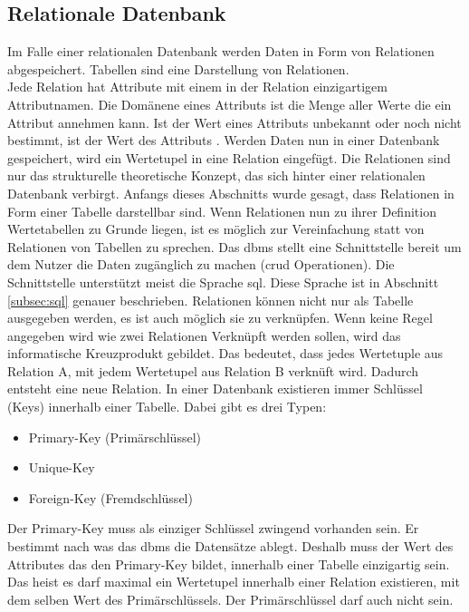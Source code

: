 \subsection{Relationale Datenbank}\label{subsec:relDB}
Im Falle einer relationalen Datenbank werden Daten in Form von Relationen abgespeichert.
Tabellen sind eine Darstellung von Relationen.\\
Jede Relation hat Attribute mit einem in der Relation einzigartigem Attributnamen.
Die Domänene eines Attributs ist die Menge aller Werte die ein Attribut annehmen kann.
Ist der Wert eines Attributs unbekannt oder noch nicht bestimmt, ist der Wert des Attributs  \citep{Studer:2016:2}.
Werden Daten nun in einer Datenbank gespeichert, wird ein Wertetupel in eine Relation eingefügt.
Die Relationen sind nur das strukturelle theoretische Konzept, das sich hinter einer relationalen Datenbank verbirgt.
Anfangs dieses Abschnitts wurde gesagt, dass Relationen in Form einer Tabelle darstellbar sind.
Wenn Relationen nun zu ihrer Definition Wertetabellen zu Grunde liegen, 
ist es möglich zur Vereinfachung statt von Relationen von Tabellen zu sprechen.
Das \ac{dbms} stellt eine Schnittstelle bereit um dem Nutzer die Daten zugänglich zu machen (\ac{crud} Operationen).
Die Schnittstelle unterstützt meist die Sprache \ac{sql}. Diese Sprache ist in Abschnitt \ref{subsec:sql} genauer beschrieben.
Relationen können nicht nur als Tabelle ausgegeben werden, es ist auch möglich sie zu verknüpfen.
Wenn keine Regel angegeben wird wie zwei Relationen Verknüpft werden sollen, wird das informatische Kreuzprodukt gebildet.
Das bedeutet, dass jedes Wertetuple aus Relation A, mit jedem Wertetupel aus Relation B verknüft wird. 
Dadurch entsteht eine neue Relation.
In einer Datenbank existieren immer Schlüssel (Keys) innerhalb einer Tabelle.
Dabei gibt es drei Typen:
\begin{itemize}
  \item Primary-Key (Primärschlüssel)
  \item Unique-Key
  \item Foreign-Key (Fremdschlüssel)
\end{itemize}
Der Primary-Key muss als einziger Schlüssel zwingend vorhanden sein. Er bestimmt nach was das \ac{dbms} die Datensätze ablegt.
Deshalb muss der Wert des Attributes das den Primary-Key bildet, innerhalb einer Tabelle einzigartig sein.
Das heist es darf maximal ein Wertetupel innerhalb einer Relation existieren, mit dem selben Wert des Primärschlüssels.
Der Primärschlüssel darf auch nicht  sein.
